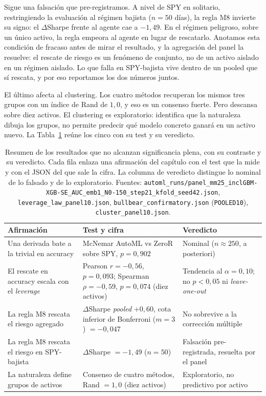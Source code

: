 Sigue una falsación que pre-registramos. A nivel de SPY en solitario, restringiendo la evaluación al régimen bajista ($n = 50$ días), la regla M8 invierte su signo: el $\Delta$Sharpe frente al agente cae a $-1{,}49$. En el régimen peligroso, sobre un único activo, la regla empeora al agente en lugar de rescatarlo. Anotamos esta condición de fracaso antes de mirar el resultado, y la agregación del panel la resuelve: el rescate de riesgo es un fenómeno de conjunto, no de un activo aislado en un régimen aislado. Lo que falla en SPY-bajista vive dentro de un pooled que sí rescata, y por eso reportamos los dos números juntos.

El último afecta al clustering. Los cuatro métodos recuperan los mismos tres grupos con un índice de Rand de $1{,}0$, y eso es un consenso fuerte. Pero descansa sobre diez activos. El clustering es exploratorio: identifica que la naturaleza dibuja los grupos, no permite predecir qué modelo concreto ganará en un activo nuevo. La Tabla~\ref{tab:mp-limites} reúne los cinco con su test y su veredicto.

\begin{table}[htbp]
\centering
\caption{Resumen de los resultados que no alcanzan significancia plena, con su contraste y su veredicto. Cada fila enlaza una afirmación del capítulo con el test que la mide y con el JSON del que sale la cifra. La columna de veredicto distingue lo nominal de lo falsado y de lo exploratorio. Fuentes: \texttt{automl\_runs/panel\_mm25\_inclGBM-XGB-SE\_AUC\_emb1\_N0-150\_step21\_kfold\_seed42.json}, \texttt{leverage\_law\_panel10.json}, \texttt{bullbear\_confirmatory.json} (\texttt{POOLED10}), \texttt{cluster\_panel10.json}.}
\label{tab:mp-limites}
\begin{tabular}{p{4.4cm}p{4.6cm}p{4.0cm}}
\toprule
Afirmación & Test y cifra & Veredicto \\
\midrule
Una derivada bate a la trivial en accuracy & McNemar AutoML vs ZeroR sobre SPY, $p = 0{,}902$ & Nominal ($n \approx 250$, a posteriori) \\
\addlinespace
El rescate en accuracy escala con el \emph{leverage} & Pearson $r = -0{,}56$, $p = 0{,}093$; Spearman $\rho = -0{,}59$, $p = 0{,}074$ (diez activos) & Tendencia al $\alpha = 0{,}10$; no $p < 0{,}05$ ni \emph{leave-one-out} \\
\addlinespace
La regla M8 rescata el riesgo agregado & $\Delta$Sharpe \emph{pooled} $+0{,}60$, cota inferior de Bonferroni ($m = 3$) $= -0{,}047$ & No sobrevive a la corrección múltiple \\
\addlinespace
La regla M8 rescata el riesgo en SPY-bajista & $\Delta$Sharpe $= -1{,}49$ ($n = 50$) & Falsación pre-registrada, resuelta por el panel \\
\addlinespace
La naturaleza define grupos de activos & Consenso de cuatro métodos, Rand $= 1{,}0$ (diez activos) & Exploratorio, no predictivo por activo \\
\bottomrule
\end{tabular}
\end{table}

